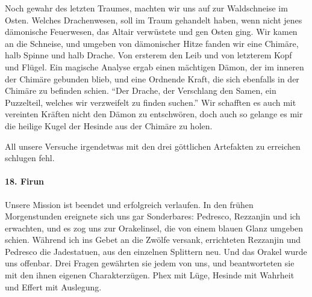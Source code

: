 Noch gewahr des letzten Traumes, machten wir uns auf zur Waldschneise im Osten. Welches Drachenwesen, soll im Traum gehandelt haben, wenn nicht jenes dämonische Feuerwesen, das Altair verwüstete und gen Osten ging. Wir kamen an die Schneise, und umgeben von dämonischer Hitze fanden wir eine Chimäre, halb Spinne und halb Drache. Von ersterem den Leib und von letzterem Kopf und Flügel. Ein magische Analyse ergab einen mächtigen Dämon, der im inneren der Chimäre gebunden blieb, und eine Ordnende Kraft, die sich ebenfalls in der Chimäre zu befinden schien. ``Der Drache, der Verschlang den Samen, ein Puzzelteil, welches wir verzweifelt zu finden suchen.'' Wir schafften es auch mit vereinten Kräften nicht den Dämon zu entschwören, doch auch so gelange es mir die heilige Kugel der Hesinde aus der Chimäre zu holen.

All unsere Versuche irgendetwas mit den drei göttlichen Artefakten zu erreichen schlugen fehl.

\paragraph{18. Firun}
Unsere Mission ist beendet und erfolgreich verlaufen. In den frühen Morgenstunden ereignete sich uns gar Sonderbares: Pedresco, Rezzanjin und ich erwachten, und es zog uns zur Orakelinsel, die von einem blauen Glanz umgeben schien. Während ich ins Gebet an die Zwölfe versank, errichteten Rezzanjin und Pedresco die Jadestatuen, aus den einzelnen Splittern neu. Und das Orakel wurde uns offenbar. Drei Fragen gewährten sie jedem von uns, und beantworteten sie mit den ihnen eigenen Charakterzügen. Phex mit Lüge, Hesinde mit Wahrheit und Effert mit Auslegung.

